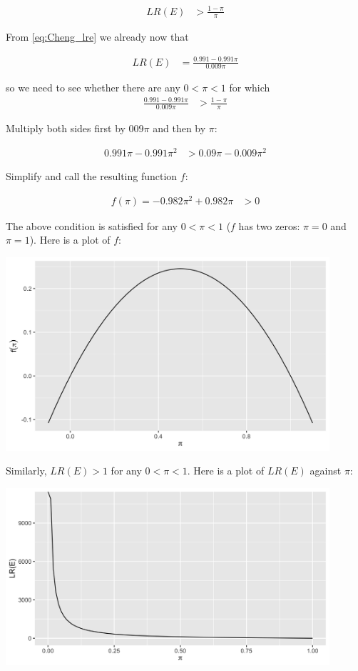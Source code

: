 \documentclass[10pt,dvipsnames,enabledeprecatedfontcommands]{scrartcl}
\begin{document}
\begin{align*}
 LR(E) &> \frac{1-\pi}{\pi}
 \end{align*}

\noindent From \eqref{eq:Cheng_lre} we already now that

\begin{align*}
 LR(E) & = \frac{0.991-0.991\pi}{0.009\pi}
 \end{align*}

\noindent so we need to see whether there are any \(0<\pi<1\) for
which\\

\begin{align*}
  \frac{0.991-0.991\pi}{0.009\pi} &> \frac{1-\pi}{\pi}
 \end{align*}

\noindent Multiply both sides first by \(009\pi\) and then by \(\pi\):

\begin{align*}
 0.991\pi - 0.991\pi^2 &> 0.09\pi - 0.009\pi^2
 \end{align*}

\noindent Simplify and call the resulting function \(f\):

\begin{align*}
 f(\pi) = - 0.982 \pi^2 + 0.982\pi &>0 
 \end{align*}

\noindent The above condition is satisfied for any \(0<\pi <1\) (\(f\)
has two zeros: \(\pi = 0\) and \(\pi = 1\)). Here is a plot of \(f\):

\includegraphics[width=12cm]{f-gate.png}

Similarly, \(LR(E)>1\) for any \(0< \pi <1\). Here is a plot of
\(LR(E)\) against \(\pi\):

\includegraphics[width=12cm]{lre-gate.png}
\end{document}
